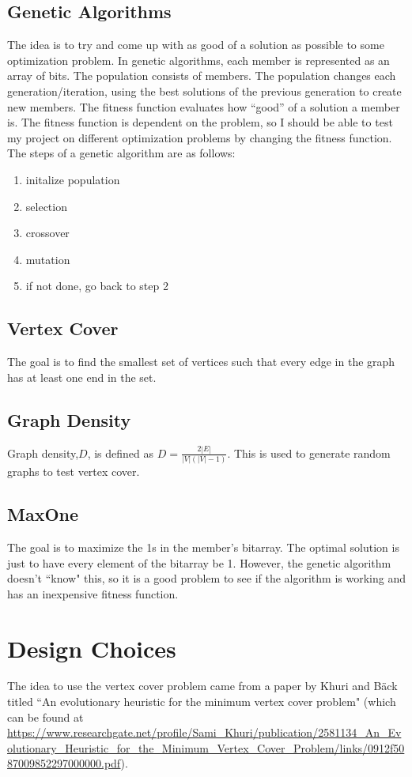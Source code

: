 \documentclass[9pt]{article}
\begin{document}
	\subsection{Genetic Algorithms}
		The idea is to try and come up with as good of a solution as
possible to some optimization problem. In genetic algorithms, each member is represented as an array
of bits. The population consists of members. The population changes each generation/iteration, using
the best solutions of the previous generation to create new members. The fitness function evaluates
how “good” of a solution a member is. The fitness function is dependent on the problem, so I should be
able to test my project on different optimization problems by changing the fitness function. The steps of
a genetic algorithm are as follows:
		\begin{enumerate}
			\item initalize population
			\item selection
			\item crossover
			\item mutation
			\item if not done, go back to step 2
		\end{enumerate}
	\subsection{Vertex Cover} The goal is to find the smallest set of vertices such that every edge in the graph has at least one end in the set.
	\subsection{Graph Density} Graph density,$D$, is defined as $D=\frac{2|E|}{|V|(|V|-1)}$. This is used to generate random graphs to test vertex cover.
	\subsection{MaxOne} The goal is to maximize the 1s in the member's bitarray. The optimal solution is just to have every element of the bitarray be 1. However, the genetic algorithm doesn't ``know" this, so it is a good problem to see if the algorithm is working and has an inexpensive fitness function.

\section{Design Choices}
The idea to use the vertex cover problem came from a paper by Khuri and B{\"a}ck titled ``An evolutionary heuristic for the minimum vertex cover problem" (which can be found at \url{https://www.researchgate.net/profile/Sami_Khuri/publication/2581134_An_Evolutionary_Heuristic_for_the_Minimum_Vertex_Cover_Problem/links/0912f5087009852297000000.pdf}).\\
\end{document}
